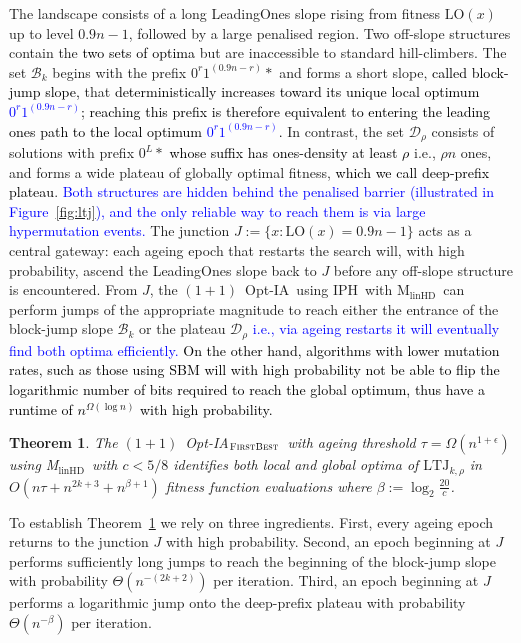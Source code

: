 \documentclass[lettersize,journal]{IEEEtran}
\newcommand{\new}[1]{\textcolor{black}{#1}}
\newcommand{\rev}[1]{\textcolor{blue}{#1}}
\newcommand{\oneoneOPTIA}{$(1+1)$~Opt-IA}
\newcommand{\linHD}{M$_{\text{linHD}}$}
\newcommand{\IPHfcm}{IPH}
\newtheorem{theorem}{Theorem}
\begin{document}
The landscape consists of a long LeadingOnes slope rising from fitness 
$\mathrm{LO}(x)$ up to level $0.9n-1$, followed by a large penalised region.  
Two off-slope structures contain the \textcolor{black}{two sets of optima} but are inaccessible to 
standard hill-climbers.  
The set $\mathcal{B}_k$ begins with the prefix $0^{r}1^{(0.9n-r)} *$ and forms a 
short slope, \new{called block-jump slope,} that \textcolor{black}{deterministically increases toward its unique local optimum 
\textcolor{blue}{$0^{r}1^{(0.9n-r)}$}; reaching 
this prefix is therefore equivalent to entering the leading ones path to the local optimum\textcolor{blue}{
$0^{r}1^{(0.9n-r)}$}.}  
In contrast, the set $\mathcal{D}_\rho$ consists of solutions with prefix 
$0^{L} *$ \textcolor{black}{whose suffix has ones-density at least $\rho$} i.e., $\rho n$ ones, and forms a wide 
plateau of globally optimal fitness, \new{which we call  deep-prefix plateau}.  
\textcolor{blue}{Both structures are hidden behind the penalised barrier (illustrated in
Figure~\ref{fig:ltj}), and the only reliable way to reach them is via large
hypermutation events.}  
The junction $J := \{x : \mathrm{LO}(x)=0.9n-1\}$ acts as a central gateway: 
each ageing epoch that restarts the search will, with high probability, ascend 
the LeadingOnes slope back to $J$ before any off-slope structure is encountered.  
From $J$, the \oneoneOPTIA~using \IPHfcm{}~with \linHD~can perform jumps of the 
appropriate magnitude to reach either the entrance of the block-jump slope $\mathcal{B}_k$ or 
the plateau $\mathcal{D}_\rho$ \rev{i.e., via ageing restarts it will eventually find both optima efficiently.} 
\textcolor{black}{On the other hand, algorithms with lower mutation rates, such as those using SBM will with high probability not be able to flip the logarithmic number of bits required to reach the global optimum, thus have a runtime of $n^{\Omega(\log n)}$ with high probability.}

\begin{theorem} \label{thm:main-tau-final}
The  $(1+1)$~Opt-IA$_{\textsc{FirstBest}}$~with ageing threshold $\tau=\Omega(n^{1+\epsilon})$ using  \linHD~with $c<5/8$  identifies both local and global optima of  $\mathrm{LTJ}_{k,\rho}$ in
	$O(n\tau + n^{2k+3} + n^{\beta+1})$ fitness function evaluations	where $\beta := \log_2 \frac{20}{c}$.
\end{theorem}

To establish Theorem~\ref{thm:main-tau-final} we rely on three ingredients.
First, every ageing epoch returns to the junction $J$ with high probability.
Second, an epoch beginning at $J$ performs sufficiently long jumps to reach the beginning of the block-jump slope with probability $\Theta(n^{-(2k+2)})$ per iteration.
Third, an epoch beginning at $J$ performs a logarithmic jump onto the deep-prefix plateau with probability $\Theta(n^{-\beta})$ per iteration.
\end{document}
